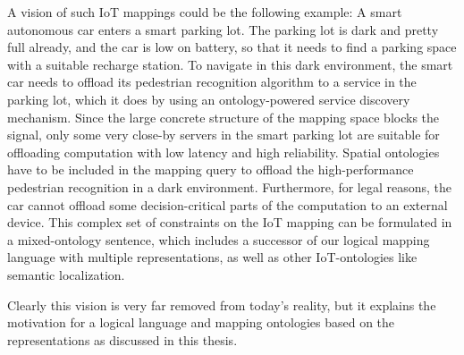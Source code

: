 A vision of such \ac{IoT} mappings could be the following example:
A smart autonomous car enters a smart parking lot.
The parking lot is dark and pretty full already, and the car is low on battery, so that it needs to find a parking space with a suitable recharge station.
To navigate in this dark environment, the smart car needs to offload its pedestrian recognition algorithm to a service in the parking lot, which it does by using an ontology-powered service discovery~\cite{weber2019service} mechanism.
Since the large concrete structure of the mapping space blocks the signal, only some very close-by servers in the smart parking lot are suitable for offloading computation with low latency and high reliability.
Spatial ontologies have to be included in the mapping query to offload the high-performance pedestrian recognition in a dark environment.
Furthermore, for legal reasons, the car cannot offload some decision-critical parts of the computation to an external device.
This complex set of constraints on the \ac{IoT} mapping can be formulated in a mixed-ontology sentence, which includes a successor of our logical mapping language with multiple representations, as well as other \ac{IoT}-ontologies like semantic localization.

Clearly this vision is very far removed from today's reality, but it explains the motivation for a logical language and mapping ontologies based on the representations as discussed in this thesis.